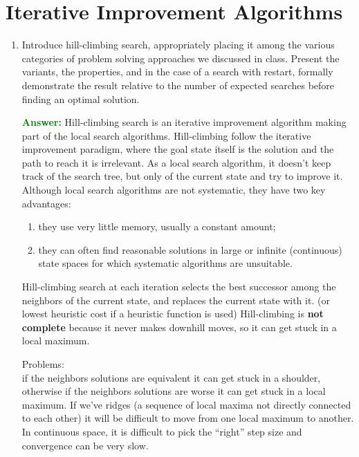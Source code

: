 \documentclass[12pt]{article}
\begin{document}
\section{Iterative Improvement Algorithms}\label{iterativeimprovement}
\begin{enumerate}[label=\textbf{II.\arabic*}]
    \item\label{q-hillclimbing}
    Introduce hill-climbing search, appropriately placing it among the various categories of problem solving approaches we discussed in class.
    Present the variants, the properties, and in the case of a search with restart, formally demonstrate the result relative to the number of expected searches before finding an optimal solution.

    \textcolor{green}{\textbf{Answer:}}
    Hill-climbing search is an iterative improvement algorithm making part of the local search algorithms.
    Hill-climbing follow the iterative improvement paradigm, where the goal state itself is the solution and the path to reach it is irrelevant.
    As a local search algorithm, it doesn't keep track of the search tree, but only of the current state and try to improve it.
    Although local search algorithms are not systematic, they have two key advantages:
    \begin{enumerate}
        \item they use very little memory, usually a constant amount;
        \item they can often find reasonable solutions in large or infinite (continuous) state spaces for which systematic algorithms are unsuitable.
    \end{enumerate} 
    Hill-climbing search at each iteration selects the best successor among the neighbors of the current state, and replaces the current state with it.
    (or lowest heuristic cost if a heuristic function is used)
    Hill-climbing is \textbf{not complete} because it never makes downhill moves, so it can get stuck in a local maximum.

    Problems:\\
    if the neighbors solutions are equivalent it can get stuck in a shoulder, otherwise if the neighbors solutions are worse it can get stuck in a local maximum.
    If we've ridges (a sequence of local maxima not directly connected to each other) it will be difficult to move from one local maximum to another.
    In continuous space, it is difficult to pick the ``right'' step size and convergence can be very slow.
    


\end{enumerate}
\end{document}

